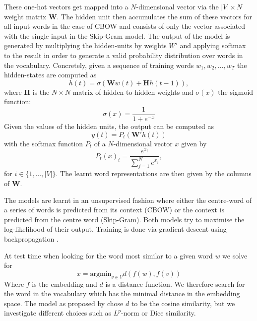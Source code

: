 \documentclass[conference]{IEEEtran}
\begin{document}
These one-hot vectors get mapped into a $N$-dimensional vector via the $|V| \times N$ weight matrix
$\boldsymbol{W}$.  The hidden unit then accumulates the sum of these vectors for all input
words in the case of CBOW and consists of only the vector associated with the single input in the 
Skip-Gram model. The output of the model is generated by multiplying the hidden-units by
weights $W'$ and applying softmax to the result in order to generate a valid
probability distribution over words in the vocabulary. Concretely, given a sequence of 
training words $w_1, w_2, \dots , w_T$ the hidden-states are computed as
\begin{equation}
	h(t) = \sigma (\boldsymbol{W}w(t) + \boldsymbol{H}h(t-1)),
\end{equation}
where $\boldsymbol{H}$ is the $N \times N$ matrix of hidden-to-hidden weights and 
$\sigma (x)$ the sigmoid function:  
\begin{equation}
	\sigma (x) = \frac{1}{1+e^{-x}} 
\end{equation}
Given the values of the hidden units, the output can be computed as
\begin{equation}
	y(t) = P_t(\boldsymbol{W'}h(t))
\end{equation}
with the softmax function $P_t$ of a $N$-dimensional vector $x$ given by 
\begin{equation}
	P_t(x)_i = \frac{e^{x_i}}{\sum_{j=1}^{N}{e^{x_j}}},
\end{equation}
for $i \in \{1, \hdots , |V|\}$.
The learnt word representations are then given by the columns of $\boldsymbol{W}$.

The models are learnt in an unsupervised fashion where either the centre-word of
a series of words is predicted from its context (CBOW) or the context is
predicted from the centre word (Skip-Gram). Both models try to maximise the
log-likelihood of their output. Training is done via gradient descent using backpropagation
\cite{rumelhart1988learning}.

At test time when looking for the word most similar to a given word $w$ we solve for 
\begin{equation}
	x = \text{argmin}_{v \in V} d(f(w),f(v))
	\label{eq:sim}
\end{equation}
Where $f$ is the embedding and $d$ is a distance function. We therefore search for the 
word in the vocabulary which has the minimal distance in the embedding space. The 
model as proposed by \cite{mikolov2013efficient} chose $d$ to be the cosine similarity, 
but we investigate different choices such as $L^p$-norm or Dice similarity.
\end{document}
